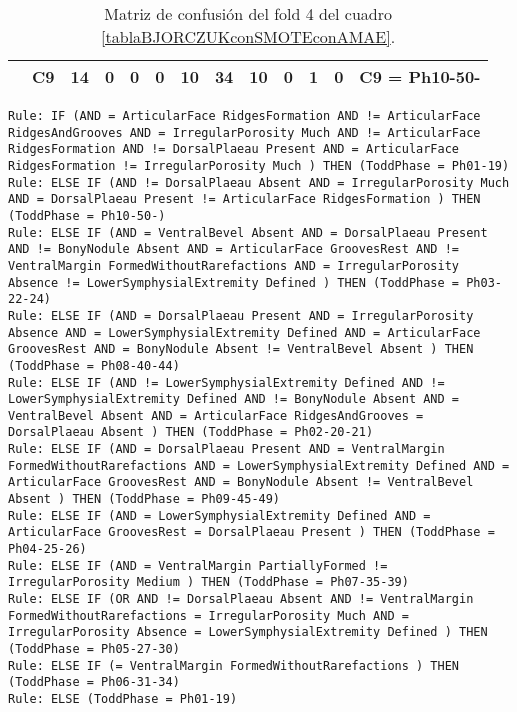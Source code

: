 \begin{table}[H]
{\begin{tabular}{|ccccccccccccc|}
\multicolumn{1}{|c|}{}                                      & \multicolumn{1}{c|}{C9} & \multicolumn{1}{c|}{\textbf{14}} & \multicolumn{1}{c|}{0}  & \multicolumn{1}{c|}{0}  & \multicolumn{1}{c|}{0}  & \multicolumn{1}{c|}{\textbf{10}} & \multicolumn{1}{c|}{\textbf{34}} & \multicolumn{1}{c|}{\textbf{10}} & \multicolumn{1}{c|}{0}  & \multicolumn{1}{c|}{\textbf{1}}  & \multicolumn{1}{c|}{0}  & C9 = Ph10-50-     \\ \hline
\end{tabular}%
}
\caption{Matriz de confusión del fold 4 del cuadro \ref{tablaBJORCZUKconSMOTEconAMAE}.}

\end{table}

\begin{lstlisting}
Rule: IF (AND = ArticularFace RidgesFormation AND != ArticularFace RidgesAndGrooves AND = IrregularPorosity Much AND != ArticularFace RidgesFormation AND != DorsalPlaeau Present AND = ArticularFace RidgesFormation != IrregularPorosity Much ) THEN (ToddPhase = Ph01-19)
Rule: ELSE IF (AND != DorsalPlaeau Absent AND = IrregularPorosity Much AND = DorsalPlaeau Present != ArticularFace RidgesFormation ) THEN (ToddPhase = Ph10-50-)
Rule: ELSE IF (AND = VentralBevel Absent AND = DorsalPlaeau Present AND != BonyNodule Absent AND = ArticularFace GroovesRest AND != VentralMargin FormedWithoutRarefactions AND = IrregularPorosity Absence != LowerSymphysialExtremity Defined ) THEN (ToddPhase = Ph03-22-24)
Rule: ELSE IF (AND = DorsalPlaeau Present AND = IrregularPorosity Absence AND = LowerSymphysialExtremity Defined AND = ArticularFace GroovesRest AND = BonyNodule Absent != VentralBevel Absent ) THEN (ToddPhase = Ph08-40-44)
Rule: ELSE IF (AND != LowerSymphysialExtremity Defined AND != LowerSymphysialExtremity Defined AND != BonyNodule Absent AND = VentralBevel Absent AND = ArticularFace RidgesAndGrooves = DorsalPlaeau Absent ) THEN (ToddPhase = Ph02-20-21)
Rule: ELSE IF (AND = DorsalPlaeau Present AND = VentralMargin FormedWithoutRarefactions AND = LowerSymphysialExtremity Defined AND = ArticularFace GroovesRest AND = BonyNodule Absent != VentralBevel Absent ) THEN (ToddPhase = Ph09-45-49)
Rule: ELSE IF (AND = LowerSymphysialExtremity Defined AND = ArticularFace GroovesRest = DorsalPlaeau Present ) THEN (ToddPhase = Ph04-25-26)
Rule: ELSE IF (AND = VentralMargin PartiallyFormed != IrregularPorosity Medium ) THEN (ToddPhase = Ph07-35-39)
Rule: ELSE IF (OR AND != DorsalPlaeau Absent AND != VentralMargin FormedWithoutRarefactions = IrregularPorosity Much AND = IrregularPorosity Absence = LowerSymphysialExtremity Defined ) THEN (ToddPhase = Ph05-27-30)
Rule: ELSE IF (= VentralMargin FormedWithoutRarefactions ) THEN (ToddPhase = Ph06-31-34)
Rule: ELSE (ToddPhase = Ph01-19)
\end{lstlisting}



